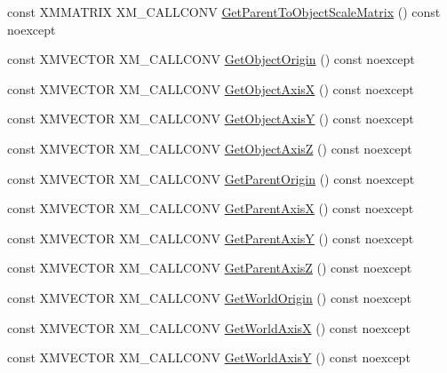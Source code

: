 \begin{DoxyCompactItemize}
\item 
const X\+M\+M\+A\+T\+R\+IX X\+M\+\_\+\+C\+A\+L\+L\+C\+O\+NV \hyperlink{classmage_1_1_transform_a77a9313c62c19dd49c11f5fa30fa2ac5}{Get\+Parent\+To\+Object\+Scale\+Matrix} () const noexcept
\item 
const X\+M\+V\+E\+C\+T\+OR X\+M\+\_\+\+C\+A\+L\+L\+C\+O\+NV \hyperlink{classmage_1_1_transform_ab0920e283e8f21d2ca766c2409993ee4}{Get\+Object\+Origin} () const noexcept
\item 
const X\+M\+V\+E\+C\+T\+OR X\+M\+\_\+\+C\+A\+L\+L\+C\+O\+NV \hyperlink{classmage_1_1_transform_a22ac692a1ff459dc85950e2810c34de9}{Get\+Object\+AxisX} () const noexcept
\item 
const X\+M\+V\+E\+C\+T\+OR X\+M\+\_\+\+C\+A\+L\+L\+C\+O\+NV \hyperlink{classmage_1_1_transform_a11db94a3ba905405cccfd5f0e5ecf6d2}{Get\+Object\+AxisY} () const noexcept
\item 
const X\+M\+V\+E\+C\+T\+OR X\+M\+\_\+\+C\+A\+L\+L\+C\+O\+NV \hyperlink{classmage_1_1_transform_a404fdd1491f8f35376a78f7bd96d09b2}{Get\+Object\+AxisZ} () const noexcept
\item 
const X\+M\+V\+E\+C\+T\+OR X\+M\+\_\+\+C\+A\+L\+L\+C\+O\+NV \hyperlink{classmage_1_1_transform_ac781a4843051cdc9b5078dbc641707d1}{Get\+Parent\+Origin} () const noexcept
\item 
const X\+M\+V\+E\+C\+T\+OR X\+M\+\_\+\+C\+A\+L\+L\+C\+O\+NV \hyperlink{classmage_1_1_transform_a0a99aa4625d2bfea0d0484f23bde0d65}{Get\+Parent\+AxisX} () const noexcept
\item 
const X\+M\+V\+E\+C\+T\+OR X\+M\+\_\+\+C\+A\+L\+L\+C\+O\+NV \hyperlink{classmage_1_1_transform_a81c1514a624946249e9c7ec65871b599}{Get\+Parent\+AxisY} () const noexcept
\item 
const X\+M\+V\+E\+C\+T\+OR X\+M\+\_\+\+C\+A\+L\+L\+C\+O\+NV \hyperlink{classmage_1_1_transform_ab5ce18e39ad529b2e87ff0df1125f076}{Get\+Parent\+AxisZ} () const noexcept
\item 
const X\+M\+V\+E\+C\+T\+OR X\+M\+\_\+\+C\+A\+L\+L\+C\+O\+NV \hyperlink{classmage_1_1_transform_a1458cffad0cf017a2302200b2679a906}{Get\+World\+Origin} () const noexcept
\item 
const X\+M\+V\+E\+C\+T\+OR X\+M\+\_\+\+C\+A\+L\+L\+C\+O\+NV \hyperlink{classmage_1_1_transform_aeb6b744fbe9843a7323fdde88421c3b4}{Get\+World\+AxisX} () const noexcept
\item 
const X\+M\+V\+E\+C\+T\+OR X\+M\+\_\+\+C\+A\+L\+L\+C\+O\+NV \hyperlink{classmage_1_1_transform_ab62a58130aae5e4094b9d6455b4b2561}{Get\+World\+AxisY} () const noexcept

\end{DoxyCompactItemize}
